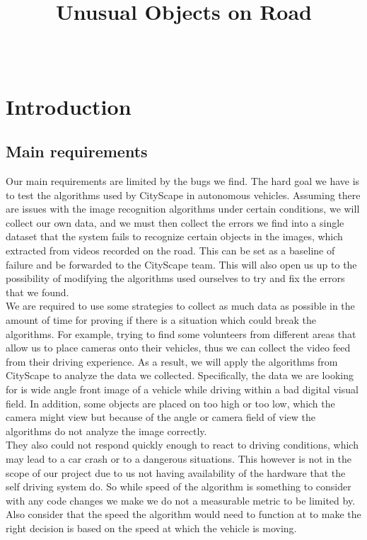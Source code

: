 \documentclass[10pt,draftclsnofoot,onecolumn,journal,compsoc]{IEEEtran}
\title{Unusual Objects on Road}
\author{
  \IEEEauthorblockN{Team (Group 32) name: Teaching AutoPilot to Dodge\\ Basil Al Zamil, Xilun Guo, and Tanner Fry} \\
  \IEEEauthorblockA{CS 461: Senior Capstone Fall 2016 \\ Oregon State University}
}
\date{}
\begin{document}
\maketitle
\IEEEdisplaynontitleabstractindextext
\IEEEpeerreviewmaketitle

\newpage

\tableofcontents

\newpage

\section{Introduction}
    \subsection{Main requirements}

    Our main requirements are limited by the bugs we find. The hard goal we have is to test the algorithms used by CityScape in autonomous vehicles. 
Assuming there are issues with the image recognition algorithms under certain conditions, we will collect our own data, and we must then collect the errors we find into a single dataset that the system fails to recognize certain objects in the images, which extracted from videos recorded on the road. 
    This can be set as a baseline of failure and be forwarded to the CityScape team. 
    This will also open us up to the possibility of modifying the algorithms used ourselves to try and fix the errors that we found. \\
    We are required to use some strategies to collect as much data as possible in the amount of time for proving if there is a situation which could break the algorithms. 
    For example, trying to find some volunteers from different areas that allow us to place cameras onto their vehicles, thus we can collect the video feed from their driving experience. 
    As a result, we will apply the algorithms from CityScape to analyze the data we collected. 
    Specifically, the data we are looking for is wide angle front image of a vehicle while driving within a bad digital visual field. 
    In addition, some objects are placed on too high or too low, which the camera might view but because of the angle or camera field of view the algorithms do not analyze the image correctly. \\
    They also could not respond quickly enough to react to driving conditions, which may lead to a car crash or to a dangerous situations. 
    This however is not in the scope of our project due to us not having availability of the hardware that the self driving system do.
    So while speed of the algorithm is something to consider with any code changes we make we do not a measurable metric to be limited by. 
    Also consider that the speed the algorithm would need to function at to make the right decision is based on the speed at which the vehicle is moving.
    
\end{document}
